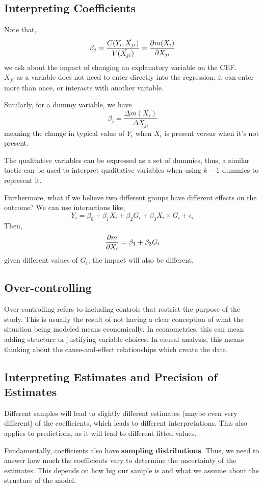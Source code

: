 \subsection{Interpreting Coefficients}
Note that,
$$\beta_j = \frac{C(Y_i, \tilde{X_{ji}})}{V(\tilde{X_{ji}})} = \pdv{m(X_i)}{X_{ji}}$$
we ask about the impact of changing an explanatory variable on the CEF. \\
$X_{ji}$ as a variable does not need to enter directly into the regression, it can enter more than once, or interacts with another variable.

Similarly, for a dummy variable, we have
$$\beta_j = \frac{\Delta m(X_i)}{\Delta X_{ji}}$$
meaning the change in typical value of $Y_i$ when $X_i$ is present versus when it's not present.

The qualitative variables can be expressed as a set of dummies, thus, a similar tactic can be used to interpret qualitative variables when using $k-1$ dummies to represent it.

Furthermore, what if we believe two different groups have different effects on the outcome? We can use interactions like,
$$Y_i = \beta_0 + \beta_1 X_i + \beta_2 G_i + \beta_3 X_i \times G_i + \epsilon_i$$
Then,
$$\pdv{m}{X_i} = \beta_1 + \beta_3 G_i$$
given different values of $G_i$, the impact will also be different.

\subsection{Over-controlling}
Over-controlling refers to including controls that restrict the purpose of the study. This is usually the result of not having a clear conception of what the situation being modeled means economically. In econometrics, this can mean adding structure or justifying variable choices. In causal analysis, this means thinking about the cause-and-effect relationships which create the data.

\subsection{Interpreting Estimates and Precision of Estimates}
Different samples will lead to slightly different estimates (maybe even very different) of the coefficients, which leads to different interpretations. This also applies to predictions, as it will lead to different fitted values.

Fundamentally, coefficients also have \textbf{sampling distributions}. Thus, we need to answer how much the coefficients vary to determine the uncertainty of the estimates. This depends on how big our sample is and what we assume about the structure of the model.

\newpage